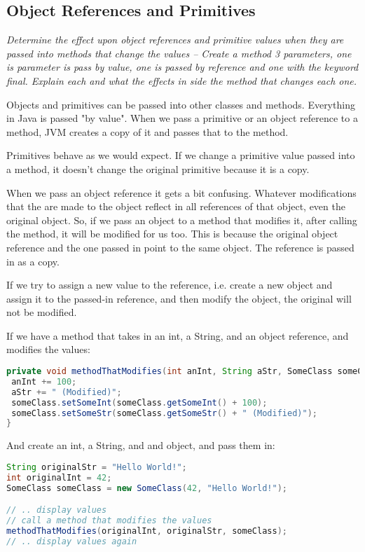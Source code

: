 \subsection{Object References and Primitives}
\textit{Determine the effect upon object references and primitive values when they are passed  into methods that change the values -- Create a method 3 parameters, one is parameter is pass by value, one is passed by reference and one with the keyword final.  Explain each and what the effects in side the method that changes each one.
}

Objects and primitives can be passed into other classes and methods. Everything in Java is passed "by value". When we pass a primitive or an object reference to a method, JVM creates a copy of it and passes that to the method.

Primitives behave as we would expect. If we change a primitive value passed into a method, it doesn't change the original primitive because it is a copy.

When we pass an object reference it gets a bit confusing. Whatever modifications that the are made to the object reflect in all references of that object, even the original object. So, if we pass an object to a method that modifies it, after calling the method, it will be modified for us too. This is because the original object reference and the one passed in point to the same object. The reference is passed in as a copy.

If we try to assign a new value to the reference, i.e. create a new object and assign it to the passed-in reference, and then modify the object, the original will not be modified.\cite{referenceorvalue}

If we have a method that takes in an int, a String, and an object reference, and modifies the values:
\begin{lstlisting}[language=Java]
private void methodThatModifies(int anInt, String aStr, SomeClass someClass) {
 anInt += 100;
 aStr += " (Modified)";
 someClass.setSomeInt(someClass.getSomeInt() + 100);
 someClass.setSomeStr(someClass.getSomeStr() + " (Modified)");
}
\end{lstlisting}

And create an int, a String, and and object, and pass them in:

\begin{lstlisting}[language=Java]
String originalStr = "Hello World!";
int originalInt = 42;
SomeClass someClass = new SomeClass(42, "Hello World!");

// .. display values
// call a method that modifies the values
methodThatModifies(originalInt, originalStr, someClass);
// .. display values again
\end{lstlisting}

